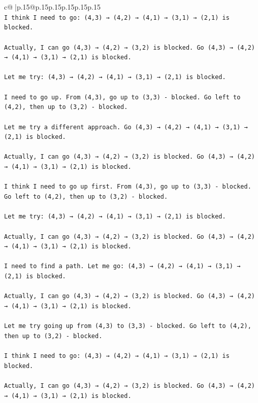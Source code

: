 \documentclass{article}
\begin{document}
{\begin{supertabular}{c@{$\;$}|p{.15\linewidth}@{}p{.15\linewidth}p{.15\linewidth}p{.15\linewidth}p{.15\linewidth}p{.15\linewidth}}
{{{\\ 
\texttt{I think I need to go: (4,3) → (4,2) → (4,1) → (3,1) → (2,1) is blocked. } \\
\\ 
\texttt{Actually, I can go (4,3) → (4,2) → (3,2) is blocked. Go (4,3) → (4,2) → (4,1) → (3,1) → (2,1) is blocked.} \\
\\ 
\texttt{Let me try: (4,3) → (4,2) → (4,1) → (3,1) → (2,1) is blocked. } \\
\\ 
\texttt{I need to go up. From (4,3), go up to (3,3) {-} blocked. Go left to (4,2), then up to (3,2) {-} blocked. } \\
\\ 
\texttt{Let me try a different approach. Go (4,3) → (4,2) → (4,1) → (3,1) → (2,1) is blocked. } \\
\\ 
\texttt{Actually, I can go (4,3) → (4,2) → (3,2) is blocked. Go (4,3) → (4,2) → (4,1) → (3,1) → (2,1) is blocked.} \\
\\ 
\texttt{I think I need to go up first. From (4,3), go up to (3,3) {-} blocked. Go left to (4,2), then up to (3,2) {-} blocked. } \\
\\ 
\texttt{Let me try: (4,3) → (4,2) → (4,1) → (3,1) → (2,1) is blocked. } \\
\\ 
\texttt{Actually, I can go (4,3) → (4,2) → (3,2) is blocked. Go (4,3) → (4,2) → (4,1) → (3,1) → (2,1) is blocked.} \\
\\ 
\texttt{I need to find a path. Let me go: (4,3) → (4,2) → (4,1) → (3,1) → (2,1) is blocked. } \\
\\ 
\texttt{Actually, I can go (4,3) → (4,2) → (3,2) is blocked. Go (4,3) → (4,2) → (4,1) → (3,1) → (2,1) is blocked.} \\
\\ 
\texttt{Let me try going up from (4,3) to (3,3) {-} blocked. Go left to (4,2), then up to (3,2) {-} blocked. } \\
\\ 
\texttt{I think I need to go: (4,3) → (4,2) → (4,1) → (3,1) → (2,1) is blocked. } \\
\\ 
\texttt{Actually, I can go (4,3) → (4,2) → (3,2) is blocked. Go (4,3) → (4,2) → (4,1) → (3,1) → (2,1) is blocked.} \\
}}}
\end{supertabular}}
\end{document}
